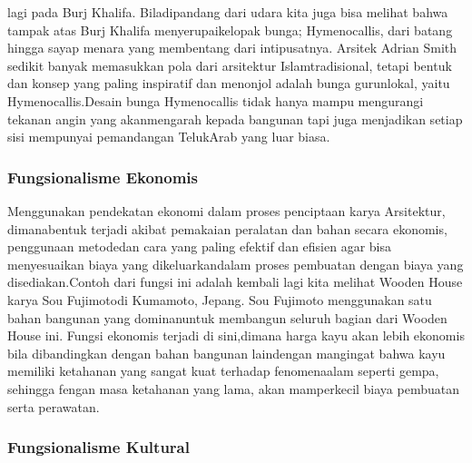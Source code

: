\documentclass[../manperil.tex]{subfiles}
\begin{document}
lagi pada Burj Khalifa. Biladipandang dari udara kita juga bisa melihat bahwa tampak atas Burj Khalifa menyerupaikelopak bunga; Hymenocallis, dari batang hingga sayap menara yang membentang dari intipusatnya. Arsitek Adrian Smith sedikit banyak memasukkan pola dari arsitektur Islamtradisional, tetapi bentuk dan konsep yang paling inspiratif dan menonjol adalah bunga gurunlokal, yaitu Hymenocallis.Desain bunga Hymenocallis tidak hanya mampu mengurangi tekanan angin yang akanmengarah kepada bangunan tapi juga menjadikan setiap sisi mempunyai pemandangan TelukArab yang luar biasa.


\subsubsection{Fungsionalisme Ekonomis}%
\label{ssub:fungsionalisme_ekonomis}


Menggunakan pendekatan ekonomi dalam proses penciptaan karya Arsitektur, dimanabentuk terjadi akibat pemakaian peralatan dan bahan secara ekonomis, penggunaan metodedan cara yang paling efektif dan efisien agar bisa menyesuaikan biaya yang dikeluarkandalam proses pembuatan dengan biaya yang disediakan.Contoh dari fungsi ini adalah kembali lagi kita melihat Wooden House karya Sou Fujimotodi Kumamoto, Jepang. Sou Fujimoto menggunakan satu bahan bangunan yang dominanuntuk membangun seluruh bagian dari Wooden House ini. Fungsi ekonomis terjadi di sini,dimana harga kayu akan lebih ekonomis bila dibandingkan dengan bahan bangunan laindengan mangingat bahwa kayu memiliki ketahanan yang sangat kuat terhadap fenomenaalam seperti gempa, sehingga fengan masa ketahanan yang lama, akan mamperkecil biaya pembuatan serta perawatan.

\subsubsection{Fungsionalisme Kultural}%
\label{ssub:fungsionalisme_kultural}
\end{document}
